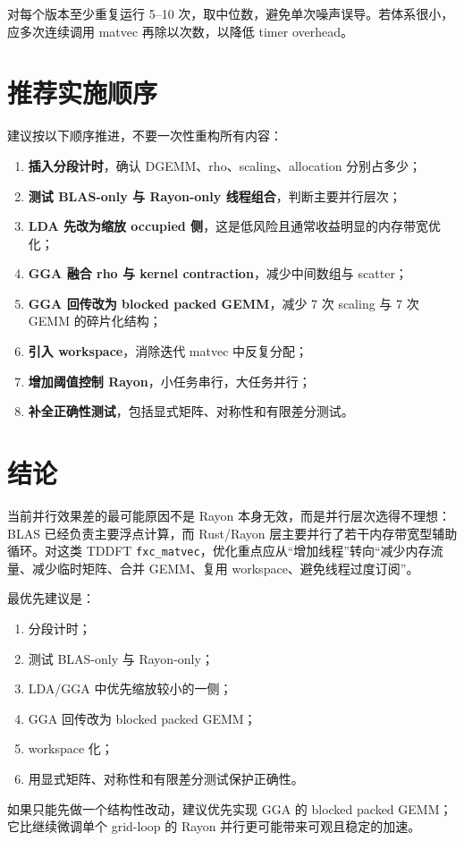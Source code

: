 \documentclass[11pt,a4paper]{ctexart}
\begin{document}
对每个版本至少重复运行 5--10 次，取中位数，避免单次噪声误导。若体系很小，应多次连续调用 matvec 再除以次数，以降低 timer overhead。

\section{推荐实施顺序}

建议按以下顺序推进，不要一次性重构所有内容：

\begin{enumerate}[leftmargin=2em]
  \item \textbf{插入分段计时}，确认 DGEMM、rho、scaling、allocation 分别占多少；
  \item \textbf{测试 BLAS-only 与 Rayon-only 线程组合}，判断主要并行层次；
  \item \textbf{LDA 先改为缩放 occupied 侧}，这是低风险且通常收益明显的内存带宽优化；
  \item \textbf{GGA 融合 rho 与 kernel contraction}，减少中间数组与 scatter；
  \item \textbf{GGA 回传改为 blocked packed GEMM}，减少 7 次 scaling 与 7 次 GEMM 的碎片化结构；
  \item \textbf{引入 workspace}，消除迭代 matvec 中反复分配；
  \item \textbf{增加阈值控制 Rayon}，小任务串行，大任务并行；
  \item \textbf{补全正确性测试}，包括显式矩阵、对称性和有限差分测试。
\end{enumerate}

\section{结论}

当前并行效果差的最可能原因不是 Rayon 本身无效，而是并行层次选得不理想：BLAS 已经负责主要浮点计算，而 Rust/Rayon 层主要并行了若干内存带宽型辅助循环。对这类 TDDFT \texttt{fxc\_matvec}，优化重点应从“增加线程”转向“减少内存流量、减少临时矩阵、合并 GEMM、复用 workspace、避免线程过度订阅”。

最优先建议是：

\begin{enumerate}[leftmargin=2em]
  \item 分段计时；
  \item 测试 BLAS-only 与 Rayon-only；
  \item LDA/GGA 中优先缩放较小的一侧；
  \item GGA 回传改为 blocked packed GEMM；
  \item workspace 化；
  \item 用显式矩阵、对称性和有限差分测试保护正确性。
\end{enumerate}

如果只能先做一个结构性改动，建议优先实现 GGA 的 blocked packed GEMM；它比继续微调单个 grid-loop 的 Rayon 并行更可能带来可观且稳定的加速。
\end{document}
